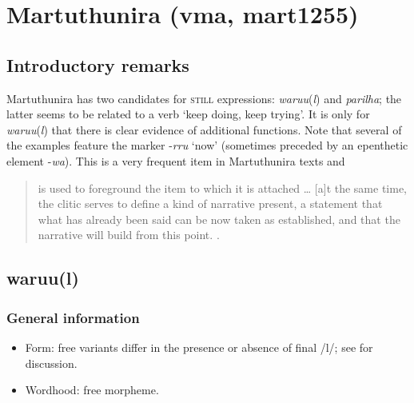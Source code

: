 \section{Martuthunira (vma, mart1255)}
\label{appendixMartuthunira}

\subsection{Introductory remarks}
Martuthunira has two candidates for \textsc{still} expressions: \textit{waruu}(\textit{l}) and \textit{parilha}; the latter seems to be related to a verb \lq keep doing, keep trying'. It is only for \textit{waruu}(\textit{l}) that there is clear evidence of additional functions. Note that several of the examples feature the marker -\textit{rru} \lq now' (sometimes preceded by an epenthetic element -\textit{wa}). This is a very frequent item in Martuthunira texts and 

\begin{quote}
is used to foreground the item to which it is attached … [a]t the same time, the clitic serves to define a kind of narrative present, a statement that what has already been said can be now taken as established, and that the narrative will build from this point. \parencite[184]{Dench1994}.
\end{quote}

\subsection{waruu(l)}
\subsubsection{General information}
\begin{itemize}
	\item Form: free variants differ in the presence or absence of final /l/; see \textcite[130–131]{Dench1994} for discussion.
	\item Wordhood: free morpheme.
\end{itemize}


